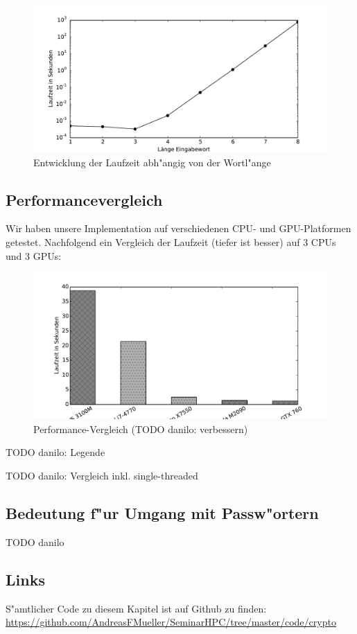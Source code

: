 \begin{refsection}
\begin{figure}[H]
	\centering
	\includegraphics[width=.9\textwidth]{crypto/graphs/runtime.pdf}
	\caption{Entwicklung der Laufzeit abh"angig von der Wortl"ange}
	\label{img:crypto:triplets}
\end{figure}

\subsection{Performancevergleich}

Wir haben unsere Implementation auf verschiedenen CPU- und GPU-Platformen
getestet. Nachfolgend ein Vergleich der Laufzeit (tiefer ist besser) auf 3 CPUs
und 3 GPUs:

\begin{figure}[H]
	\centering
	\includegraphics[width=.9\textwidth]{crypto/graphs/speed_comparison_v1.pdf}
	\caption{Performance-Vergleich (TODO danilo: verbessern)}
	\label{img:crypto:speed_comparison_v1}
\end{figure}

TODO danilo: Legende

TODO danilo: Vergleich inkl. single-threaded

\subsection{Bedeutung f"ur Umgang mit Passw"ortern}

TODO danilo

\subsection{Links}
\label{crypto:resultate:links}

S"amtlicher Code zu diesem Kapitel ist auf Github zu finden:\\
\url{https://github.com/AndreasFMueller/SeminarHPC/tree/master/code/crypto}


\printbibliography[heading=subbibliography]
\end{refsection}
